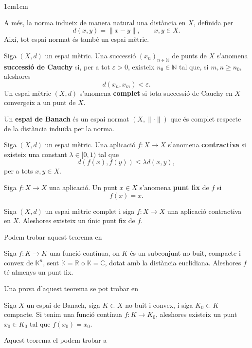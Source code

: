\begin{adjustwidth}{1cm}{1cm}
\begin{definicio}
A més, la norma indueix de manera natural una distància en $X$, definida per
\[
    d(x,y)=\|x-y\|, \qquad x,y\in X.
\]
Així, tot espai normat és també un espai mètric.
\end{definicio}

\begin{definicio}
Siga $(X,d)$ un espai mètric. Una successió $(x_n)_{n\in\mathbb{N}}$ de punts
de $X$ s'anomena \textbf{successió de Cauchy} si, per a tot $\varepsilon>0$,
existeix $n_0\in\mathbb{N}$ tal que, si $m,n\geq n_0$, aleshores
\[
d(x_n,x_m)<\varepsilon.
\]
Un espai mètric $(X,d)$ s'anomena \textbf{complet} si tota successió de Cauchy
en $X$ convergeix a un punt de $X$.
\end{definicio}

\begin{definicio}
    Un \textbf{espai de Banach} és un espai normat $(X,\|\cdot\|)$ que és complet respecte de la distància induïda per la norma. 
\end{definicio}

\begin{definicio}
Siga $(X,d)$ un espai mètric. Una aplicació $f:X\to X$ s'anomena
\textbf{contractiva} si existeix una constant $\lambda\in[0,1)$ tal que
\[
d(f(x),f(y))\leq \lambda d(x,y),
\]
per a tots $x,y\in X$.
\end{definicio}

\begin{definicio}
Siga $f:X\to X$ una aplicació. Un punt $x\in X$ s'anomena \textbf{punt fix}
de $f$ si
\[
f(x)=x.
\]
\end{definicio}

\begin{teorema}
    Siga $(X,d)$ un espai mètric complet i siga $f: X \to X$ una aplicació contractiva en $X$. Aleshores existeix un únic punt fix de $f$. 
    
    Podem trobar aquest teorema en \cite[Cap.5, Secció 5.1]{kreyszig}
    \label{banach}
\end{teorema}

\begin{teorema}

    Siga $f:K\to K$ una funció contínua, on $K$ és un subconjunt no buit, compacte i convex de $\mathbb{K}^n$, sent $\mathbb{K}=\mathbb{R}$ o $\mathbb{K}=\mathbb{C}$, dotat amb la distància euclidiana. Aleshores $f$ té almenys un punt fix.
    
    Una prova d'aquest teorema se pot trobar en \cite[pp. 38-40]{hurewicz} 
    \label{brouwer}
\end{teorema}

\begin{teorema}
    Siga $X$ un espai de Banach, siga $K\subset X$ no buit i convex, i siga $K_0\subset K$ compacte. Si tenim una funció contínua $f:K\to K_0$, aleshores existeix un punt $x_0\in K_0$ tal que $f(x_0)=x_0$.

    Aquest teorema el podem trobar a \cite[pàg. 21]{pata}
    \label{schauder}
    
\end{teorema}


\end{adjustwidth}